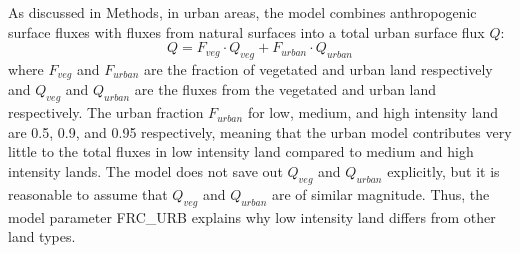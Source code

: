 \documentclass[draft,linenumbers]{agujournal}
\begin{document}

As discussed in Methods, in urban areas, the model combines anthropogenic surface fluxes with fluxes from natural surfaces into a total urban surface flux $Q$:
$$ Q= F_{veg} \cdot Q_{veg} + F_{urban} \cdot Q_{urban}$$
where $F_{veg}$ and $F_{urban}$ are the fraction of vegetated and urban land respectively and $Q_{veg}$ and $Q_{urban}$ are the fluxes from the vegetated and urban land respectively. 
The urban fraction $F_{urban}$ for low, medium, and high intensity land are 0.5, 0.9, and 0.95 respectively, meaning that the urban model contributes very little to the total fluxes in low intensity land compared to medium and high intensity lands.
The model does not save out $Q_{veg}$ and $Q_{urban}$ explicitly, but it is reasonable to assume that $Q_{veg}$ and $Q_{urban}$ are of similar magnitude. Thus, the model parameter \textsc{FRC\_URB} explains why low intensity land differs from other land types. 
\end{document}

